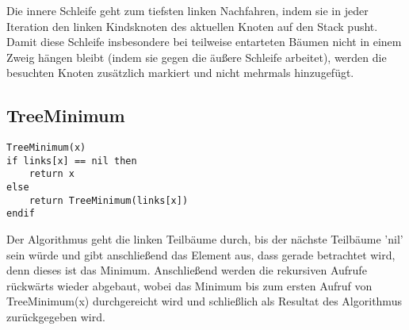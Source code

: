 Die innere Schleife geht zum tiefsten linken Nachfahren, indem sie in jeder Iteration den linken Kindsknoten des aktuellen Knoten auf den Stack pusht. 
Damit diese Schleife insbesondere bei teilweise entarteten Bäumen nicht in einem Zweig hängen bleibt (indem sie gegen die äußere Schleife arbeitet), werden die besuchten Knoten zusätzlich markiert und nicht mehrmals hinzugefügt.



\subsection*{TreeMinimum}
\begin{lstlisting}
TreeMinimum(x)
if links[x] == nil then
    return x
else
    return TreeMinimum(links[x])
endif
\end{lstlisting}
Der Algorithmus geht die linken Teilbäume durch, bis der nächste Teilbäume 'nil' sein würde und gibt anschließend das Element aus, dass gerade betrachtet wird, denn dieses ist das Minimum. Anschließend werden die rekursiven Aufrufe rückwärts wieder abgebaut, wobei das Minimum bis zum ersten Aufruf von TreeMinimum(x) durchgereicht wird und schließlich als Resultat des Algorithmus zurückgegeben wird.